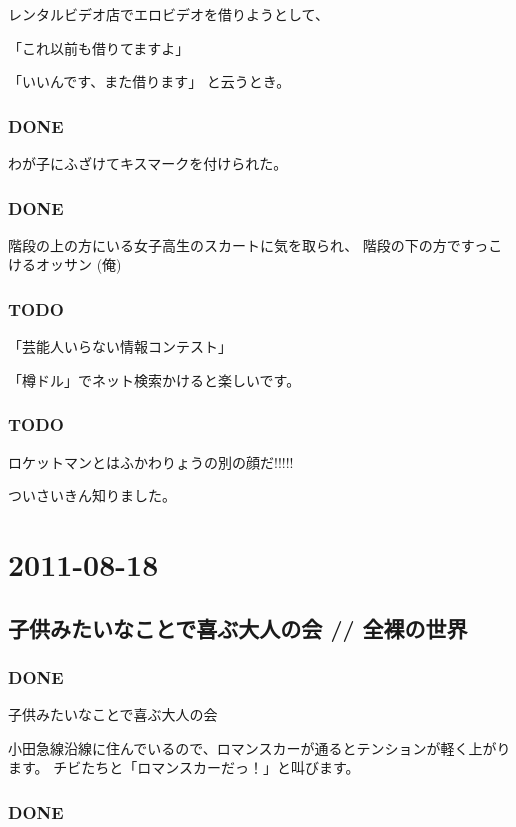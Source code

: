 \documentclass[11pt]{article}
\begin{document}
レンタルビデオ店でエロビデオを借りようとして、

「これ以前も借りてますよ」

「いいんです、また借ります」
と云うとき。
\subsubsection{\textbf{DONE}}
\label{sec-81_1_6}

わが子にふざけてキスマークを付けられた。
\subsubsection{\textbf{DONE}}
\label{sec-81_1_7}

階段の上の方にいる女子高生のスカートに気を取られ、
階段の下の方ですっこけるオッサン (俺)
\subsubsection{\textbf{TODO}}
\label{sec-81_1_8}

「芸能人いらない情報コンテスト」

「樽ドル」でネット検索かけると楽しいです。
\subsubsection{\textbf{TODO}}
\label{sec-81_1_9}

ロケットマンとはふかわりょうの別の顔だ!!!!!

ついさいきん知りました。
\section{2011-08-18}
\label{sec-82}
\subsection{子供みたいなことで喜ぶ大人の会 // 全裸の世界}
\label{sec-82_1}
\subsubsection{\textbf{DONE}}
\label{sec-82_1_1}

子供みたいなことで喜ぶ大人の会

小田急線沿線に住んでいるので、ロマンスカーが通るとテンションが軽く上がります。
チビたちと「ロマンスカーだっ！」と叫びます。
\subsubsection{\textbf{DONE}}
\label{sec-82_1_2}
\end{document}
